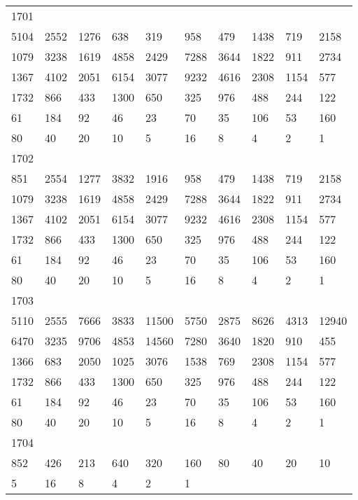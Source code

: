\begin{longtable}{*{10}{l}}
1701&&&&&&&&&\\
5104& 2552& 1276& 638& 319& 958& 479& 1438& 719& 2158\\
1079& 3238& 1619& 4858& 2429& 7288& 3644& 1822& 911& 2734\\
1367& 4102& 2051& 6154& 3077& 9232& 4616& 2308& 1154& 577\\
1732& 866& 433& 1300& 650& 325& 976& 488& 244& 122\\
61& 184& 92& 46& 23& 70& 35& 106& 53& 160\\
80& 40& 20& 10& 5& 16& 8& 4& 2& 1\\

1702&&&&&&&&&\\
851& 2554& 1277& 3832& 1916& 958& 479& 1438& 719& 2158\\
1079& 3238& 1619& 4858& 2429& 7288& 3644& 1822& 911& 2734\\
1367& 4102& 2051& 6154& 3077& 9232& 4616& 2308& 1154& 577\\
1732& 866& 433& 1300& 650& 325& 976& 488& 244& 122\\
61& 184& 92& 46& 23& 70& 35& 106& 53& 160\\
80& 40& 20& 10& 5& 16& 8& 4& 2& 1\\

1703&&&&&&&&&\\
5110& 2555& 7666& 3833& 11500& 5750& 2875& 8626& 4313& 12940\\
6470& 3235& 9706& 4853& 14560& 7280& 3640& 1820& 910& 455\\
1366& 683& 2050& 1025& 3076& 1538& 769& 2308& 1154& 577\\
1732& 866& 433& 1300& 650& 325& 976& 488& 244& 122\\
61& 184& 92& 46& 23& 70& 35& 106& 53& 160\\
80& 40& 20& 10& 5& 16& 8& 4& 2& 1\\

1704&&&&&&&&&\\
852& 426& 213& 640& 320& 160& 80& 40& 20& 10\\
5& 16& 8& 4& 2& 1& \\


\end{longtable}
